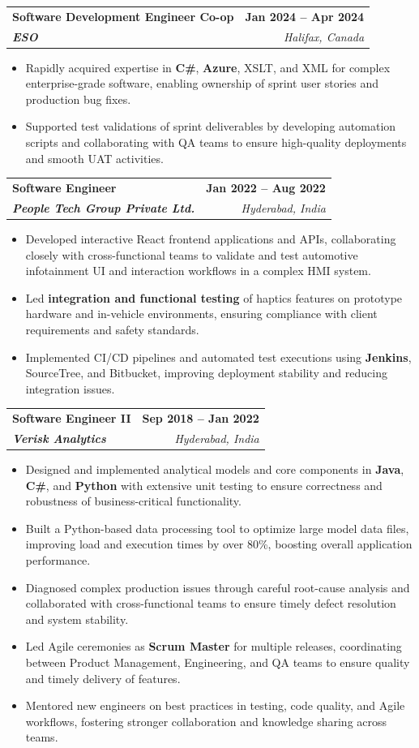 \documentclass[letterpaper,11pt]{article}
\makeatletter
\newcommand{\resumeItem}[1]{
  \item\small{
    {#1 \vspace{-2pt}}
  }
}
\newcommand{\resumeSubheading}[4]{
  \vspace{-2pt}\item
    \begin{tabular*}{1.0\textwidth}[t]{l@{\extracolsep{\fill}}r}
      \textbf{#1} & \textbf{\small #2} \\
      \textit{\small#3} & \textit{\small #4} \\
    \end{tabular*}\vspace{-7pt}
}
\newcommand{\resumeItemListStart}{\begin{itemize}}
\newcommand{\resumeItemListEnd}{\end{itemize}\vspace{-5pt}}
\makeatother
\begin{document}
    \resumeSubheading
      {\textbf{Software Development Engineer Co-op}}{\textbf{Jan 2024 -- Apr 2024}}
      {\textbf{ESO}}{Halifax, Canada}
      \resumeItemListStart
        \resumeItem{Rapidly acquired expertise in \textbf{C\#}, \textbf{Azure}, XSLT, and XML for complex enterprise-grade software, enabling ownership of sprint user stories and production bug fixes.}
        \resumeItem{Supported test validations of sprint deliverables by developing automation scripts and collaborating with QA teams to ensure high-quality deployments and smooth UAT activities.}
      \resumeItemListEnd

    \resumeSubheading
      {\textbf{Software Engineer}}{\textbf{Jan 2022 -- Aug 2022}}
      {\textbf{People Tech Group Private Ltd.}}{Hyderabad, India}
      \resumeItemListStart
        \resumeItem{Developed interactive React frontend applications and APIs, collaborating closely with cross-functional teams to validate and test automotive infotainment UI and interaction workflows in a complex HMI system.}
        \resumeItem{Led \textbf{integration and functional testing} of haptics features on prototype hardware and in-vehicle environments, ensuring compliance with client requirements and safety standards.}
        \resumeItem{Implemented CI/CD pipelines and automated test executions using \textbf{Jenkins}, SourceTree, and Bitbucket, improving deployment stability and reducing integration issues.}
      \resumeItemListEnd

    \resumeSubheading
      {\textbf{Software Engineer II}}{\textbf{Sep 2018 -- Jan 2022}}
      {\textbf{Verisk Analytics}}{Hyderabad, India}
      \resumeItemListStart
        \resumeItem{Designed and implemented analytical models and core components in \textbf{Java}, \textbf{C\#}, and \textbf{Python} with extensive unit testing to ensure correctness and robustness of business-critical functionality.}
        \resumeItem{Built a Python-based data processing tool to optimize large model data files, improving load and execution times by over 80\%, boosting overall application performance.}
        \resumeItem{Diagnosed complex production issues through careful root-cause analysis and collaborated with cross-functional teams to ensure timely defect resolution and system stability.}
        \resumeItem{Led Agile ceremonies as \textbf{Scrum Master} for multiple releases, coordinating between Product Management, Engineering, and QA teams to ensure quality and timely delivery of features.}
        \resumeItem{Mentored new engineers on best practices in testing, code quality, and Agile workflows, fostering stronger collaboration and knowledge sharing across teams.}
      \resumeItemListEnd
\end{document}
